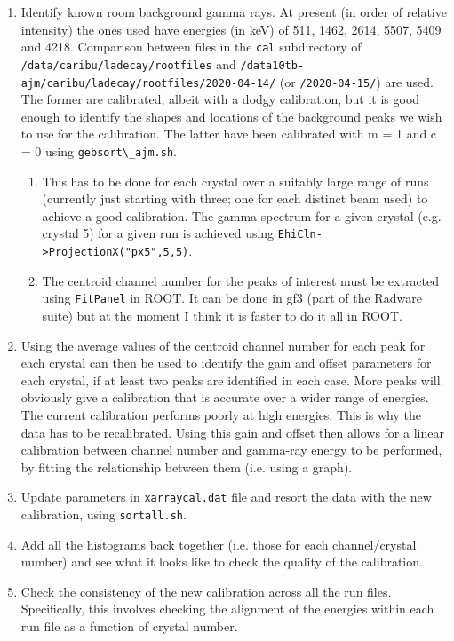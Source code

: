 \documentclass{article}
\begin{document}
\begin{enumerate}
\begin{enumerate}
\item Identify known room background gamma rays.
At present (in order of relative intensity) the ones used have energies (in keV) of 511, 1462, 2614, 5507, 5409 and 4218. Comparison between files in the \verb#cal# subdirectory of \verb#/data/caribu/ladecay/rootfiles# and \verb#/data10tb-ajm/caribu/ladecay/rootfiles/2020-04-14/# (or \verb#/2020-04-15/#) are used.
The former are calibrated, albeit with a dodgy calibration, but it is good enough to identify the shapes and locations of the background peaks we wish to use for the calibration.
The latter have been calibrated with m = 1 and c = 0 using \verb#gebsort\_ajm.sh#. 
\begin{enumerate}
\item This has to be done for each crystal over a suitably large range of runs (currently just starting with three; one for each distinct beam used) to achieve a good calibration. The gamma spectrum for a given crystal (e.g. crystal 5) for a given run is achieved using \verb#EhiCln->ProjectionX("px5",5,5)#.
\item The centroid channel number for the peaks of interest must be extracted using \verb#FitPanel# in ROOT. It can be done in gf3 (part of the Radware suite) but at the moment I think it is faster to do it all in ROOT.
\end{enumerate}

\item Using the average values of the centroid channel number for each peak for each crystal can then be used to identify the gain and offset parameters for each crystal, if at least two peaks are identified in each case.
More peaks will obviously give a calibration that is accurate over a wider range of energies.
The current calibration performs poorly at high energies.
This is why the data has to be recalibrated.
Using this gain and offset then allows for a linear calibration between channel number and gamma-ray energy to be performed, by fitting the relationship between them (i.e. using a graph).

\item Update parameters in \verb#xarraycal.dat# file and resort the data with the new calibration, using \verb#sortall.sh#.

\item Add all the histograms back together (i.e. those for each channel/crystal number) and see what it looks like to check the quality of the calibration. 

\item Check the consistency of the new calibration across all the run files. Specifically, this involves checking the alignment of the energies within each run file as a function of crystal number.   
\end{enumerate}
\end{enumerate}


%
\end{document}
